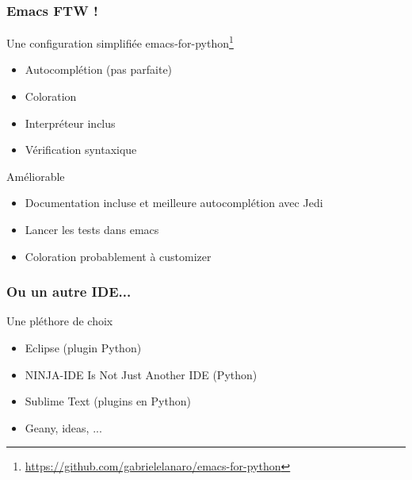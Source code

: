 \documentclass{beamer}
\begin{document}
\begin{frame}
  \frametitle{Emacs FTW !}

  \begin{block}{Une configuration simplifiée}
    emacs-for-python\footnote{\tiny\url{https://github.com/gabrielelanaro/emacs-for-python}}
    \begin{itemize}
    \item Autocomplétion (pas parfaite)
    \item Coloration
    \item Interpréteur inclus
    \item Vérification syntaxique
    \end{itemize}
  \end{block}

  \begin{block}{Améliorable}
    \begin{itemize}
    \item Documentation incluse et meilleure autocomplétion avec Jedi
    \item Lancer les tests dans emacs
    \item Coloration probablement à customizer
    \end{itemize}
  \end{block}
\end{frame}

\begin{frame}
  \frametitle{Ou un autre IDE...}

  \begin{block}{Une pléthore de choix}
    \begin{itemize}
    \item Eclipse (plugin Python)
    \item NINJA-IDE Is Not Just Another IDE (Python)
    \item Sublime Text (plugins en Python)
    \item Geany, ideas, ...
    \end{itemize}
  \end{block}
\end{frame}
\end{document}

